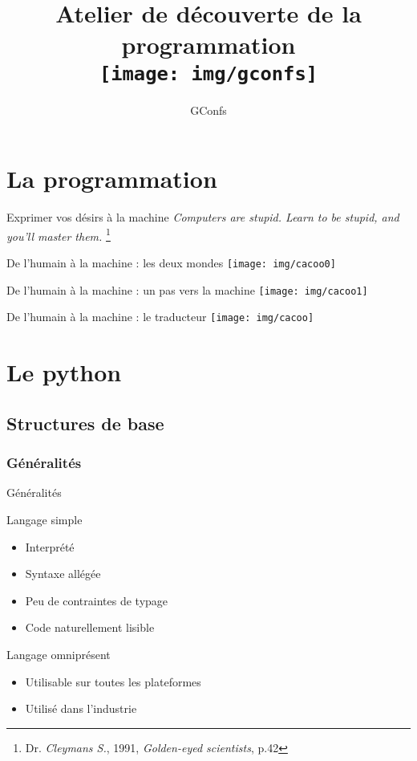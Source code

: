 \documentclass{beamer}
\author{GConfs}
\title[Journée de découverte des métiers de l’ingénieur]{Atelier de découverte
de la programmation\\
\texttt{[image: img/gconfs]}
}
\begin{document}
\maketitle
\section{La programmation}
\begin{frame}{Exprimer vos désirs à la machine}
\emph{Computers are stupid. Learn to be stupid, and you’ll master them.}
\footnote{Dr. \textit{Cleymans S.}, 1991, \textit{Golden-eyed
scientists}, p.42}
\end{frame}
\begin{frame}{De l’humain à la machine : les deux mondes}
    \texttt{[image: img/cacoo0]}
\end{frame}
\begin{frame}{De l’humain à la machine : un pas vers la machine}
    \texttt{[image: img/cacoo1]}
\end{frame}
\begin{frame}{De l’humain à la machine : le traducteur}
    \texttt{[image: img/cacoo]}
\end{frame}
\section{Le python}
\subsection{Structures de base}
\subsubsection{Généralités}
\begin{frame}{Généralités}
\begin{block}{Langage simple}
    \begin{itemize}
        \item Interprété
        \item Syntaxe allégée
        \item Peu de contraintes de typage
        \item Code naturellement lisible
    \end{itemize}
\end{block}
\begin{block}{Langage omniprésent}
    \begin{itemize}
        \item Utilisable sur toutes les plateformes
        \item Utilisé dans l’industrie
    \end{itemize}
\end{block}
\end{frame}
\end{document}
